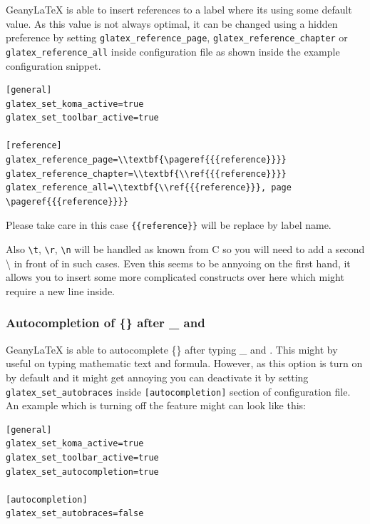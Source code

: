 \documentclass[%
paper=a4,%
fontsize=11pt,%
twoside=false,%
DIV18,
headsepline,
plainheadsepline,
footsepline,
plainfootsepline,
bibliography=totoc,%
listof=totoc,%
BCOR10mm,%
parskip=half,%
openany,%
]{scrartcl}
\begin{document}
Geany\LaTeX{} is able to insert references to a label where its
using some default value. As this value is not always optimal, it
can be changed using a hidden preference by setting
\texttt{glatex\_reference\_page}, \texttt{glatex\_reference\_chapter} or
\texttt{glatex\_reference\_all} inside configuration file as shown inside
the example configuration snippet.

\begin{lstlisting}
[general]
glatex_set_koma_active=true
glatex_set_toolbar_active=true

[reference]
glatex_reference_page=\\textbf{\pageref{{{reference}}}}
glatex_reference_chapter=\\textbf{\\ref{{{reference}}}}
glatex_reference_all=\\textbf{\\ref{{{reference}}}, page \pageref{{{reference}}}}
\end{lstlisting}

Please take care in this case \texttt{\{\{reference\}\}} will be
replace by label name.

Also \texttt{\textbackslash{}t}, \texttt{\textbackslash{}r},
\texttt{\textbackslash{}n} will be handled as known from C so you will
need to add a second \textbackslash{} in front of in such cases. Even
this seems to be annyoing on the first hand, it allows you to insert some
more complicated constructs over  here which might require a new line inside.


\subsubsection{Autocompletion of \{\} after \_ and }
\label{sec:autoadding_of_braces}
Geany\LaTeX{} is able to autocomplete \{\} after typing \_ and
. This might by useful on typing mathematic text and
formula. However, as this option is turn on by default and it might
get annoying you can deactivate it by setting \texttt{glatex\_set\_autobraces}
inside \texttt{[autocompletion]} section of configuration file. An example
which is turning off the feature might can look like this:

\begin{lstlisting}
[general]
glatex_set_koma_active=true
glatex_set_toolbar_active=true
glatex_set_autocompletion=true

[autocompletion]
glatex_set_autobraces=false
\end{lstlisting}
\end{document}
